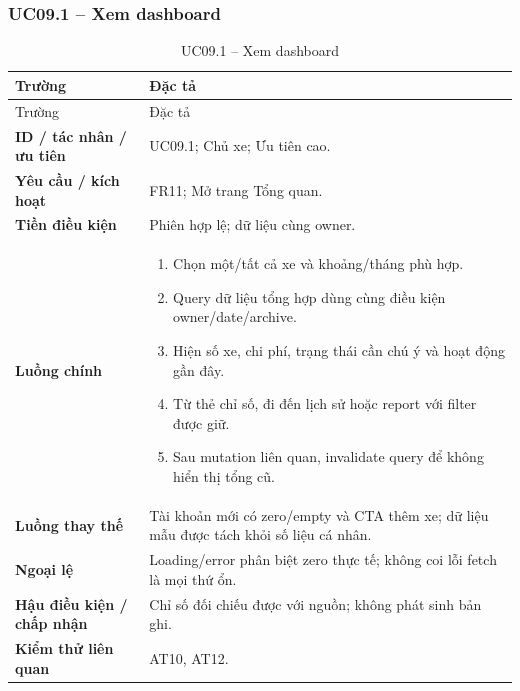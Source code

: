 \subsubsection{UC09.1 -- Xem dashboard}\label{uc:UC09.1}
\begin{smalltable}\begin{longtable}{L{3.2cm}L{11.8cm}}
\caption{UC09.1 -- Xem dashboard}\label{tab:UC09.1}\\
\toprule Trường & Đặc tả\\\midrule\endfirsthead
\toprule Trường & Đặc tả\\\midrule\endhead
\textbf{ID / tác nhân / ưu tiên} & UC09.1; Chủ xe; Ưu tiên cao.\\
\textbf{Yêu cầu / kích hoạt} & FR11; Mở trang Tổng quan.\\
\textbf{Tiền điều kiện} & Phiên hợp lệ; dữ liệu cùng owner.\\
\textbf{Luồng chính} & \begin{enumerate}[leftmargin=*,nosep]
\item Chọn một/tất cả xe và khoảng/tháng phù hợp.
\item Query dữ liệu tổng hợp dùng cùng điều kiện owner/date/archive.
\item Hiện số xe, chi phí, trạng thái cần chú ý và hoạt động gần đây.
\item Từ thẻ chỉ số, đi đến lịch sử hoặc report với filter được giữ.
\item Sau mutation liên quan, invalidate query để không hiển thị tổng cũ.
\end{enumerate}\\
\textbf{Luồng thay thế} & Tài khoản mới có zero/empty và CTA thêm xe; dữ liệu mẫu được tách khỏi số liệu cá nhân.\\
\textbf{Ngoại lệ} & Loading/error phân biệt zero thực tế; không coi lỗi fetch là mọi thứ ổn.\\
\textbf{Hậu điều kiện / chấp nhận} & Chỉ số đối chiếu được với nguồn; không phát sinh bản ghi.\\
\textbf{Kiểm thử liên quan} & AT10, AT12.\\
\bottomrule\end{longtable}\end{smalltable}

